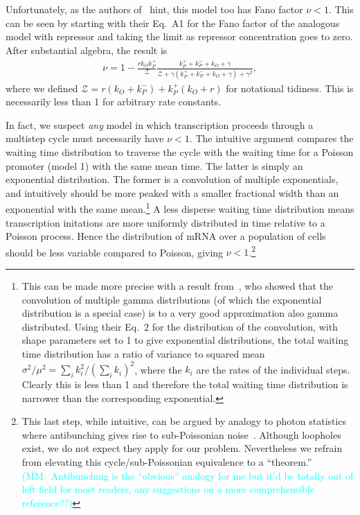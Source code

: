 \documentclass[12pt]{article}%
\newcommand{\mmnote}[1]{\textcolor{cyan}{(MM:~#1)}}
\begin{document}
Unfortunately, as the authors of~\cite{Mitarai2015} hint, this
model too has Fano factor $\nu<1$. This can be seen by starting
with their Eq.~A1 for the Fano factor of the analogous model with
repressor and taking the limit as repressor concentration goes to
zero. After substantial algebra, the result is
\begin{align}
\nu = 1 - \frac{r k_O k_P^+}{\mathcal{Z}}
\frac{k_P^+ + k_P^- + k_O + \gamma}
        {\mathcal{Z} + \gamma(k_P^+ + k_P^- + k_O + \gamma) + \gamma^2},
\end{align}
where we defined $\mathcal{Z} = r(k_O + k_P^-) + k_P^+(k_O + r)$
for notational tidiness. This is necessarily less than 1 for
arbitrary rate constants.

In fact, we suspect \textit{any} model in which transcription
proceeds through a multistep cycle must necessarily have $\nu<1$.
The intuitive argument compares the waiting time distribution to
traverse the cycle with the waiting time for a Poisson promoter
(model 1) with the same mean time. The latter is simply an
exponential distribution. The former is a convolution of multiple
exponentials, and intuitively should be more peaked with a
smaller fractional width than an exponential with the same mean.\footnote{
This can be made more precise with a result
from~\cite{Stewart2007}, who showed that the convolution of
multiple gamma distributions (of which the exponential
distribution is a special case) is to a very good approximation
also gamma distributed. Using their Eq.~2 for the distribution of
the convolution, with shape parameters set to 1 to
give exponential distributions, the total waiting time
distribution has a ratio of variance to squared mean 
$\sigma^2/\mu^2 = \sum_i k_i^2/\left(\sum_i k_i\right)^2$,
where the $k_i$ are the rates of the individual steps. Clearly
this is less than 1 and therefore the total waiting time
distribution is narrower than the corresponding exponential.} A
less disperse waiting time distribution means transcription
initations are more uniformly distributed in time relative to a
Poisson process. Hence the distribution of mRNA over a population
of cells should be less variable compared to Poisson, giving
$\nu<1$.\footnote{
This last step, while intuitive, can be argued by analogy to
photon statistics where antibunching gives rise to sub-Poissonian
noise~\cite{Paul1982, Zou1990}. Although loopholes exist, we do
not expect they apply for our problem. Nevertheless we refrain
from elevating this cycle/sub-Poissonian equivalence to a ``theorem.''
\mmnote{Antibunching is the ``obvious'' analogy for me but it'd
be totally out of left field for most readers, any suggestions on
a more comprehensible reference??}
}
\end{document}
